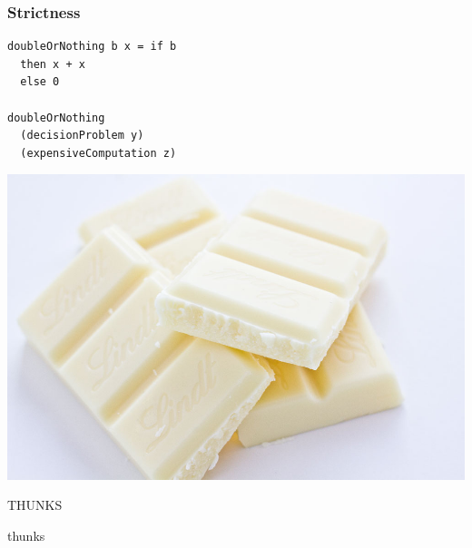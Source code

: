 \documentclass[14pt,mathserif]{beamer}
\begin{document}
\begin{frame}[fragile]
\frametitle{Strictness}
\begin{lstlisting}
doubleOrNothing b x = if b 
  then x + x
  else 0

doubleOrNothing 
  (decisionProblem y) 
  (expensiveComputation z)
\end{lstlisting}
\end{frame}

\begin{frame}
\hspace*{-11.2mm}
\includegraphics[width=\paperwidth]{whitechocolate}
\end{frame}

\begin{frame}
\centering
{\fontsize{60}{60}\selectfont THUNKS}
\end{frame}

\begin{frame}
\vspace*{8mm}
\centering
\small thunks 
\end{frame}
\end{document}
